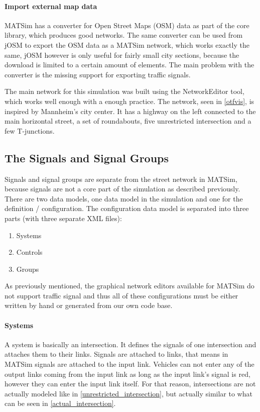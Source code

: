 \paragraph{Import external map data} MATSim has a converter for Open Street Maps (OSM) data as part of the core library, which produces good networks. The same converter can be used from jOSM to export the OSM data as a MATSim network, which works exactly the same, jOSM however is only useful for fairly small city sections, because the download is limited to a certain amount of elements. The main problem with the converter is the missing support for exporting traffic signals.

The main network for this simulation was built using the NetworkEditor tool, which works well enough with a enough practice. The network, seen in \autoref{otfvis}, is inspired by Mannheim's city center. It has a highway on the left connected to the main horizontal street, a set of roundabouts, five unrestricted intersection and a few T-junctions.

\subsection*{The Signals and Signal Groups}

Signals and signal groups are separate from the street network in MATSim, because signals are not a core part of the simulation as described previously. There are two data models, one data model in the simulation and one for the definition / configuration. The configuration data model is separated into three parts (with three separate XML files):

\begin{enumerate}
	\item Systems
	\item Controls
	\item Groups
\end{enumerate}

As previously mentioned, the graphical network editors available for MATSim do not support traffic signal and thus all of these configurations must be either written by hand or generated from our own code base.

\paragraph{Systems} A system is basically an intersection. It defines the signals of one intersection and attaches them to their links. Signals are attached to links, that means in MATSim signals are attached to the input link. Vehicles can not enter any of the output links coming from the input link as long as the input link's signal is red, however they can enter the input link itself. For that reason, intersections are not actually modeled like in \autoref{unrestricted_intersection}, but actually similar to what can be seen in \autoref{actual_intersection}.

